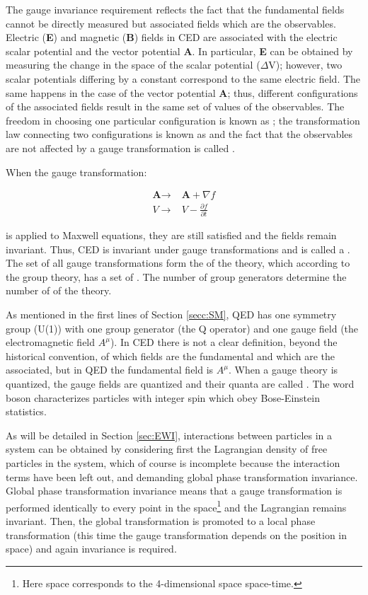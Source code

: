 The gauge invariance requirement reflects the fact that the fundamental fields cannot be directly measured but associated fields which are the observables. Electric (\textbf{E}) and magnetic (\textbf{B}) fields in CED are associated with the electric scalar potential  and the vector potential \textbf{A}. In particular, \textbf{E} can be obtained by measuring the change in the space of the scalar potential (\textbf{$\Delta$}V); however, two scalar potentials differing by a constant  correspond to the same electric field. The same happens in the case of the vector potential \textbf{A}; thus, different configurations of the associated fields result in the same set of values of the observables. The freedom in choosing one particular configuration is known as ; the transformation law connecting two configurations is known as  and the fact that the observables are not affected by a gauge transformation is called .

When the gauge transformation:  

\begin{align}\label{cov_der}
\textbf{A} \to &\textbf{A} + \nabla f\nonumber\\
V \to & V - \frac{\partial f}{\partial t}
\end{align}

\noindent is applied to Maxwell equations, they are still satisfied and the fields remain invariant. Thus, CED is invariant under gauge transformations and is called a . The set of all gauge transformations form the  of the theory, which according to the group theory, has a set of . The number of group generators determine the number of  of the theory.

As mentioned in the first lines of Section \ref{secc:SM}, QED has one symmetry group (U(1)) with one group generator (the Q operator) and one gauge field (the electromagnetic field $A^\mu$). In CED there is not a clear definition, beyond the historical convention, of which fields are the fundamental and which are the associated, but in QED the fundamental field is $A^\mu$. When a gauge theory is quantized, the gauge fields are quantized and their quanta are called . The word boson characterizes particles with integer spin which obey Bose-Einstein statistics.     

As will be detailed in Section \ref{sec:EWI}, interactions between particles in a system can be obtained by considering first the Lagrangian density of free particles in the system, which of course is incomplete because the interaction terms have been left out, and demanding global phase transformation invariance. Global phase transformation invariance means that a gauge transformation is performed identically to every point in the space\footnote{Here space corresponds to the 4-dimensional space \ie space-time.} and the Lagrangian remains invariant. Then, the global transformation is promoted to a local phase transformation (this time the gauge transformation depends on the position in space) and again invariance is required.

